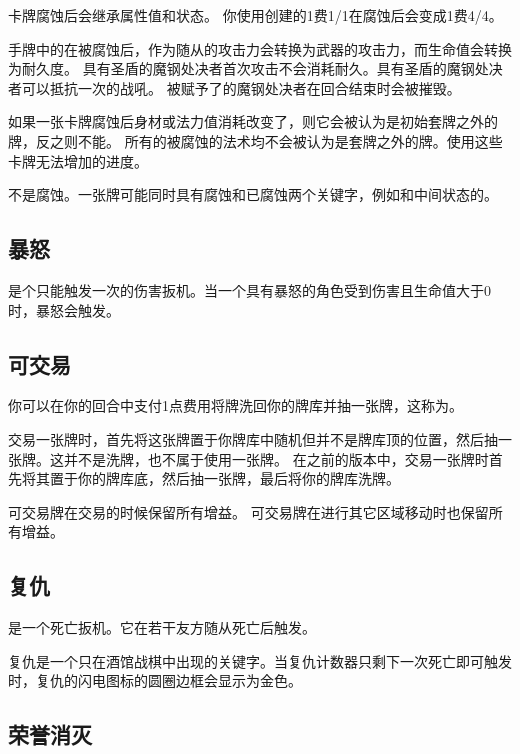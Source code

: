 卡牌腐蚀后会继承属性值和状态。
\example 你使用创建的1费1/1在腐蚀后会变成1费4/4。

\notice 手牌中的在被腐蚀后，作为随从的攻击力会转换为武器的攻击力，而生命值会转换为耐久度。
\example 具有圣盾的魔钢处决者首次攻击不会消耗耐久。具有圣盾的魔钢处决者可以抵抗一次的战吼。
\example 被赋予了的魔钢处决者在回合结束时会被摧毁。

如果一张卡牌腐蚀后身材或法力值消耗改变了，则它会被认为是初始套牌之外的牌，反之则不能。
\notice 所有的被腐蚀的法术均不会被认为是套牌之外的牌。使用这些卡牌无法增加的进度。

不是腐蚀。一张牌可能同时具有腐蚀和已腐蚀两个关键字，例如和中间状态的。

\subsection{暴怒}
\label{frenzy}

是个只能触发一次的伤害扳机。当一个具有暴怒的角色受到伤害且生命值大于0时，暴怒会触发。

\subsection{可交易}
\label{tradeable}

你可以在你的回合中支付1点费用将牌洗回你的牌库并抽一张牌，这称为。

交易一张牌时，首先将这张牌置于你牌库中随机但并不是牌库顶的位置，然后抽一张牌。这并不是洗牌，也不属于使用一张牌。
在之前的版本中，交易一张牌时首先将其置于你的牌库底，然后抽一张牌，最后将你的牌库洗牌。

可交易牌在交易的时候保留所有增益。
\notice {}可交易牌在进行其它区域移动时也保留所有增益。

\subsection{复仇}
\label{avenge}

是一个死亡扳机。它在若干友方随从死亡后触发。

复仇是一个只在酒馆战棋中出现的关键字。当复仇计数器只剩下一次死亡即可触发时，复仇的闪电图标的圆圈边框会显示为金色。

\subsection{荣誉消灭}
\label{honorably_kill}

